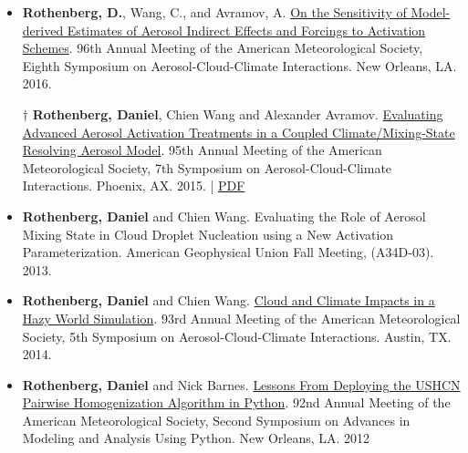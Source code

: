\documentclass[11pt,letterpaper]{article}
\begin{document}
\begin{itemize}[itemindent=-10pt]
 \item \textbf{Rothenberg, D.}, Wang, C., and Avramov, A. \href{https://ams.confex.com/ams/96Annual/webprogram/Paper289914.html}{On the Sensitivity of Model-derived Estimates of Aerosol Indirect Effects and Forcings to Activation Schemes}. 96th Annual Meeting of the American Meteorological Society, Eighth Symposium on Aerosol-Cloud-Climate Interactions. New Orleans, LA. 2016.

 \item[$\dagger$] \textbf{Rothenberg, Daniel}, Chien Wang and Alexander Avramov. \href{https://ams.confex.com/ams/95Annual/webprogram/Paper268747.html}{Evaluating Advanced Aerosol Activation Treatments in a Coupled Climate/Mixing-State Resolving Aerosol Model}. 95th Annual Meeting of the American Meteorological Society, 7th Symposium on Aerosol-Cloud-Climate Interactions. Phoenix, AX. 2015. | \href{https://figshare.com/articles/Evaluating_Advanced_Aerosol_Activation_Treatments_in_a_Coupled_Climate_Mixing-State_Resolving_Aerosol_Model/3475226}{PDF}

 \item \textbf{Rothenberg, Daniel} and Chien Wang. Evaluating the Role of Aerosol Mixing State in Cloud Droplet Nucleation using a New Activation Parameterization. American Geophysical Union Fall Meeting, (A34D-03). 2013.

 \item \textbf{Rothenberg, Daniel} and Chien Wang. \href{http://figshare.com/articles/AMS_2014_Evaluating_the_Role_of_Aerosol_Mixing_State_in_Cloud_Droplet_Nucleation_towards_Developing_a_New_Activation_Parameterization/918655}{Cloud and Climate Impacts in a Hazy World Simulation}. 93rd Annual Meeting of the American Meteorological Society, 5th Symposium on Aerosol-Cloud-Climate Interactions. Austin, TX. 2014.

 \item \textbf{Rothenberg, Daniel} and Nick Barnes. \href{https://ams.confex.com/ams/92Annual/webprogram/Paper198219.html}{Lessons From Deploying the USHCN Pairwise Homogenization Algorithm in Python}. 92nd Annual Meeting of the American Meteorological Society, Second Symposium on Advances in Modeling and Analysis Using Python. New Orleans, LA. 2012
\end{itemize}
\end{document}
